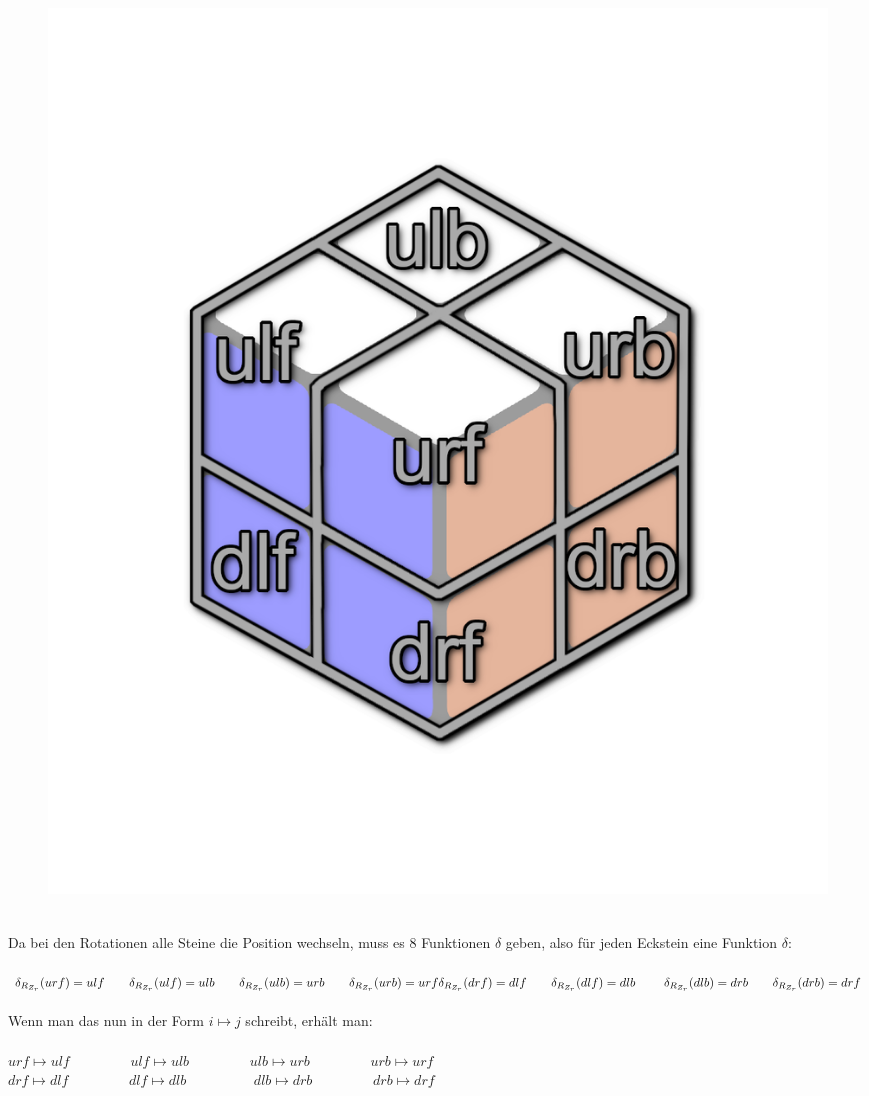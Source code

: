 \documentclass[12pt,a4paper, usenames, dvipsnames]{article}
\begin{document}
\begin{figure}[H]
\centering
\includegraphics[scale=0.13]{auf_ulf.png}
\end{figure}
\ \\
Da bei den Rotationen alle Steine die Position wechseln, muss es 8 Funktionen $\delta$ geben, also für jeden Eckstein eine Funktion $\delta$: \\
\\
$
\delta_{R_{Z_r}}(urf) = ulf \ \ \ \ \ \ \delta_{R_{Z_r}}(ulf) = ulb \ \ \ \ \ \ \delta_{R_{Z_r}}(ulb) = urb \ \ \ \ \ \ \delta_{R_{Z_r}}(urb) = urf \\
\delta_{R_{Z_r}}(drf) = dlf \ \ \ \ \ \ \delta_{R_{Z_r}}(dlf) = dlb \ \ \ \ \ \ \ \delta_{R_{Z_r}}(dlb) = drb \ \ \ \ \ \ \delta_{R_{Z_r}}(drb) = drf
$
\\
\\
Wenn man das nun in der Form $i \mapsto j$ schreibt, erhält man: \\
\\
$urf \mapsto ulf$ \ \ \ \ \ \ \ \ $ulf \mapsto ulb$ \ \ \ \ \ \ \ \ $ulb \mapsto urb$ \ \ \ \ \ \ \ \ $urb \mapsto urf$ \\
$drf \mapsto dlf$ \ \ \ \ \ \ \ \ $dlf \mapsto dlb$ \ \ \ \ \ \ \ \ \ $dlb \mapsto drb$ \ \ \ \ \ \ \ \ $drb \mapsto drf$ \\
\end{document}
